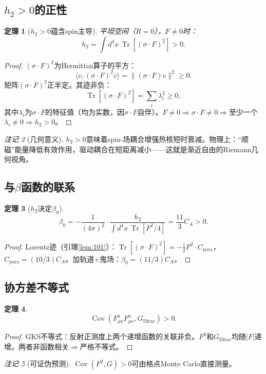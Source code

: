 \documentclass[12pt,a4paper]{article}
\theoremstyle{plain}
\newtheorem{theorem}{定理}[section]\newtheorem{lemma}[theorem]{引理}\newtheorem{corollary}[theorem]{推论}\newtheorem{proposition}[theorem]{命题}
\theoremstyle{definition}\newtheorem{definition}[theorem]{定义}
\theoremstyle{remark}\newtheorem{remark}[theorem]{注记}
\begin{document}
\subsection{$h_2>0$的正性}\label{sec:h2pos}
\begin{theorem}[$h_2>0$蕴含spin主导]\label{thm:h2pos}
平坦空间（$R=0$），$F\neq 0$时：
\begin{equation}\label{eq:h2flat}
h_2=\int d^4x\,\operatorname{Tr}[(\sigma\cdot F)^2]>0.
\end{equation}
\end{theorem}
\begin{proof}
$(\sigma\cdot F)^2$为Hermitian算子的平方：
\begin{equation}\label{eq:sigmaFsq}
\langle v,(\sigma\cdot F)^2v\rangle=\|(\sigma\cdot F)v\|^2\geq 0.
\end{equation}
矩阵$(\sigma\cdot F)^2$正半定。其迹非负：
\begin{equation}\label{eq:trh2}
\operatorname{Tr}[(\sigma\cdot F)^2] = \sum_i \lambda_i^2 \geq 0,
\end{equation}
其中$\lambda_i$为$\sigma\cdot F$的特征值（均为实数，因$\sigma\cdot F$自伴）。$F\neq 0\Rightarrow\sigma\cdot F\neq 0\Rightarrow$至少一个$\lambda_i\neq 0\Rightarrow h_2>0$。
\end{proof}
\begin{remark}[几何意义]
$h_2>0$意味着spin-场耦合增强热核短时衰减。物理上：``顺磁''能量降低有效作用，驱动耦合在短距离减小——这就是渐近自由的Riemann几何视角。
\end{remark}
\subsection{与$\beta$函数的联系}\label{sec:h2beta}
\begin{theorem}[$h_2$决定$\beta_0$]\label{thm:h2beta}
\begin{equation}\label{eq:h2tobeta}
\beta_0=-\frac{1}{(4\pi)^2}\cdot\frac{h_2}{\int d^4x\,\operatorname{Tr}[F^2/4]}=\frac{11}{3}C_A>0.
\end{equation}
\end{theorem}
\begin{proof}
Lorentz迹（引理\ref{lem:101}）：$\operatorname{Tr}[(\sigma\cdot F)^2]=-\frac{1}{2}F^2\cdot C_{\mathrm{para}}$，$C_{\mathrm{para}}=(10/3)C_A$。加轨道+鬼场：$\beta_0=(11/3)C_A$。
\end{proof}
\subsection{协方差不等式}\label{sec:cov}
\begin{theorem}\label{thm:cov}
\begin{equation}\label{eq:cov}
\operatorname{Cov}(F_{\mu\nu}^aF_{\mu\nu}^a,G_{\mathrm{Dirac}})>0.
\end{equation}
\end{theorem}
\begin{proof}
GKS不等式：反射正测度上两个递增函数的关联非负。$F^2$和$G_{\mathrm{Dirac}}$均随$|F|$递增。两者非函数相关$\Rightarrow$严格不等式。
\end{proof}
\begin{remark}[可证伪预测]
$\operatorname{Cov}(F^2,G)>0$可由格点Monte Carlo直接测量。
\end{remark}
\end{document}

